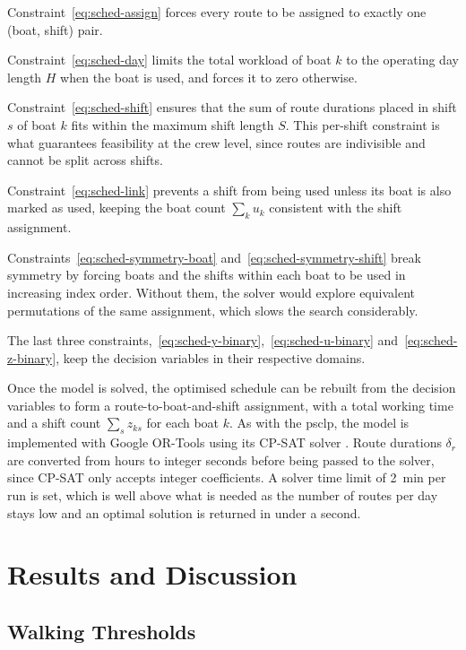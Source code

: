 \documentclass[12pt]{article}
\begin{document}
Constraint~\eqref{eq:sched-assign} forces every route to be assigned to exactly one (boat, shift) pair.

Constraint~\eqref{eq:sched-day} limits the total workload of boat \(k\) to the operating day length \(H\) when the boat is used, and forces it to zero otherwise.

Constraint~\eqref{eq:sched-shift} ensures that the sum of route durations placed in shift \(s\) of boat \(k\) fits within the maximum shift length \(S\). This per-shift constraint is what guarantees feasibility at the crew level, since routes are indivisible and cannot be split across shifts.

Constraint~\eqref{eq:sched-link} prevents a shift from being used unless its boat is also marked as used, keeping the boat count \(\sum_k u_k\) consistent with the shift assignment.

Constraints~\eqref{eq:sched-symmetry-boat} and~\eqref{eq:sched-symmetry-shift} break symmetry by forcing boats and the shifts within each boat to be used in increasing index order. Without them, the solver would explore equivalent permutations of the same assignment, which slows the search considerably.

The last three constraints,~\eqref{eq:sched-y-binary},~\eqref{eq:sched-u-binary} and~\eqref{eq:sched-z-binary}, keep the decision variables in their respective domains.

Once the model is solved, the optimised schedule can be rebuilt from the decision variables to form a route-to-boat-and-shift assignment, with a total working time and a shift count \(\sum_s z_{ks}\) for each boat \(k\). As with the \ac{psclp}, the model is implemented with Google OR-Tools \parencite{ortools} using its CP-SAT solver \parencite{cpsat}. Route durations \(\delta_r\) are converted from hours to integer seconds before being passed to the solver, since CP-SAT only accepts integer coefficients. A solver time limit of \qty{2}{\minute} per run is set, which is well above what is needed as the number of routes per day stays low and an optimal solution is returned in under a second.

\section{Results and Discussion}
\label{sec:results-and-discussion}

\subsection{Walking Thresholds}
\label{subsec:walking-thresholds}
\end{document}
